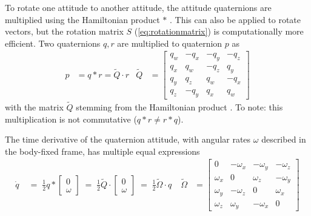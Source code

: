 To rotate one attitude to another attitude, the attitude quaternions are multiplied using the Hamiltonian product $*$ .
This can also be applied to rotate vectors, but the rotation matrix $S$ (\autoref{eq:rotationmatrix}) is computationally more efficient.
Two quaternions $q, r$ are multiplied to quaternion $p$ as \cite{stevens2015}
\begin{align}
    p &= q * r = \tilde Q \cdot r &
    \tilde Q &= \begin{bmatrix}
        q_w & -q_x & -q_y & -q_z \\
        q_x & q_w & -q_z & q_y \\
        q_y & q_z & q_w & -q_x \\
        q_z & -q_y & q_x & q_w
    \end{bmatrix} 
    \label{eq:quaternion-mult}
\end{align}
with the matrix $\tilde Q$ stemming from the Hamiltonian product \cite{stevens2015}.
To note: this multiplication is not commutative ($q*r \neq r*q$).

The time derivative of the quaternion attitude, with angular rates $\omega$ described in the body-fixed frame, has multiple equal expressions \cite{zipfel2007, sola2017, stevens2015}
\begin{align}
    \dot q \;
    &= \; \frac{1}{2} q * \begin{bmatrix}
        0 \\ \omega
    \end{bmatrix} \;
    = \; \frac{1}{2} \tilde Q \cdot \begin{bmatrix}
        0 \\ \omega
    \end{bmatrix} \;
    = \; \frac{1}{2} \tilde \Omega \cdot q \;
    & 
    \tilde \Omega &= \begin{bmatrix}
        0 & -\omega_x & -\omega_y & -\omega_z \\
        \omega_x & 0 & \omega_z & -\omega_y \\
        \omega_y & -\omega_z & 0 & \omega_x \\
        \omega_z & \omega_y & -\omega_x & 0
    \end{bmatrix}    
    \label{eq:quaternion-deriv}
\end{align}

